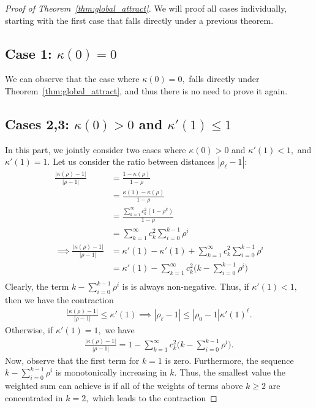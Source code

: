 \documentclass[twoside]{article}
\theoremstyle{definition}
\begin{document}
\begin{proof}[Proof of Theorem~\ref{thm:global_attract}]
We will proof all cases individually, starting with the first case that falls directly under a previous theorem. 

\subsection*{Case 1: $\kappa(0)=0$}
We can observe that the case where $\kappa(0)=0,$ falls directly under Theorem~\ref{thm:global_attract}, and thus there is no need to prove it again.

\subsection*{Cases 2,3: $\kappa(0)>0$ and $\kappa'(1)\le 1$} In this part, we jointly consider two cases where $\kappa(0)>0$ and $\kappa'(1) < 1,$ and $\kappa'(1)=1.$ Let us consider the ratio between distances $|\rho_\ell-1|$:
\begin{align*}
    \frac{|\kappa(\rho)-1|}{|\rho-1|} &= \frac{1-\kappa(\rho)}{1-\rho} \\
    &=\frac{\kappa(1)-\kappa(\rho)}{1-\rho}\\
    &=\frac{\sum_{k=1}^\infty c_k^2 (1-\rho^k)}{1-\rho}\\
    &=\sum_{k=1}^\infty c_k^2 \sum_{i=0}^{k-1}\rho^i\\
\implies \frac{|\kappa(\rho)-1|}{|\rho-1|} &=\kappa'(1)-\kappa'(1)+\sum_{k=1}^\infty c_k^2 \sum_{i=0}^{k-1} \rho^i\\
&= \kappa'(1)-\sum_{k=1}^\infty c_k^2 \big(k-\sum_{i=0}^{k-1} \rho^i\big)\\
\end{align*}
Clearly, the term $k-\sum_{i=0}^{k-1} \rho^i$ is is always non-negative. Thus, if $\kappa'(1)<1,$ then we have the contraction 
\begin{align*}
    \frac{|\kappa(\rho)-1|}{|\rho-1|} \le \kappa'(1) \implies |\rho_\ell-1| \le |\rho_0-1| \kappa'(1)^\ell.
\end{align*}
Otherwise, if $\kappa'(1)=1,$ we have 
\begin{align*}
    \frac{|\kappa(\rho)-1|}{|\rho-1|} = 1-\sum_{k=1}^\infty c_k^2 \big(k-\sum_{i=0}^{k-1} \rho^i\big).
\end{align*}
Now, observe that the first term for $k=1$ is zero. Furthermore, the sequence $k-\sum_{i=0}^{k-1}\rho^i$ is monotonically increasing in $k$. Thus, the smallest value the weighted sum can achieve is if all of the weights of terms above $k\ge 2$ are concentrated in $k=2,$ which leads to the contraction

\end{proof}
\end{document}

